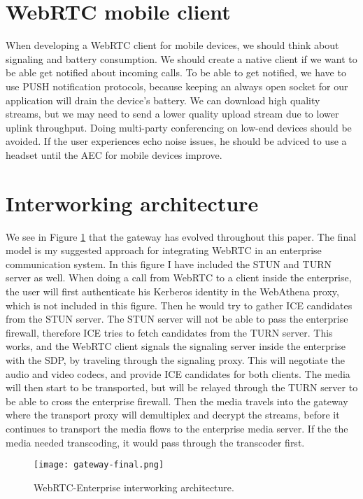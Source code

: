 \section{WebRTC mobile client}
When developing a WebRTC client for mobile devices, we should think about signaling and battery consumption. We should create a native client if we want to be able get notified about incoming calls. To be able to get notified, we have to use PUSH notification protocols, because keeping an always open socket for our application will drain the device's battery. We can download high quality streams, but we may need to send a lower quality upload stream due to lower uplink throughput. Doing multi-party conferencing on low-end devices should be avoided. If the user experiences echo noise issues, he should be adviced to use a headset until the AEC for mobile devices improve.

\section{Interworking architecture}

We see in Figure \ref{fig:gateway-final} that the gateway has evolved throughout this paper. The final model is my suggested approach for integrating WebRTC in an enterprise communication system. In this figure I have included the STUN and TURN server as well. When doing a call from WebRTC to a client inside the enterprise, the user will first authenticate his Kerberos identity in the WebAthena proxy, which is not included in this figure. Then he would try to gather ICE candidates from the STUN server. The STUN server will not be able to pass the enterprise firewall, therefore ICE tries to fetch candidates from the TURN server. This works, and the WebRTC client signals the signaling server inside the enterprise with the SDP, by traveling through the signaling proxy. This will negotiate the audio and video codecs, and provide ICE candidates for both clients. The media will then start to be transported, but will be relayed through the TURN server to be able to cross the enterprise firewall. Then the media travels into the gateway where the transport proxy will demultiplex and decrypt the streams, before it continues to transport the media flows to the enterprise media server. If the the media needed transcoding, it would pass through the transcoder first.
\\
\begin{figure}[here]
\centerline{\texttt{[image: gateway-final.png]}}
\caption{WebRTC-Enterprise interworking architecture.}
\label{fig:gateway-final}
\end{figure}


